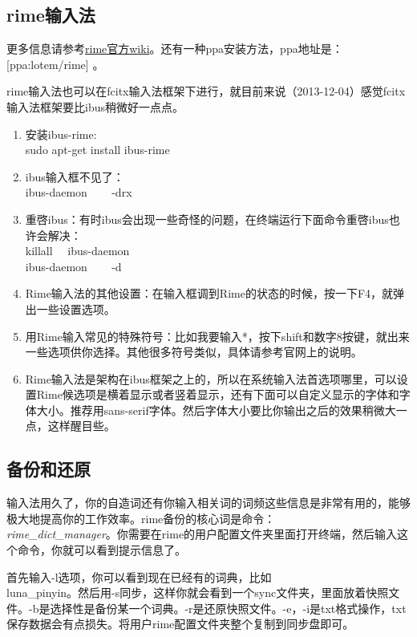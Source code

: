 \documentclass[12pt,oneside]{book}
\begin{document}
\begin{common-format}
\section{rime输入法}
更多信息请参考\href{https://code.google.com/p/rimeime/w/list}{rime官方wiki}。还有一种ppa安装方法，ppa地址是：[ppa:lotem/rime] 。

rime输入法也可以在fcitx输入法框架下进行，就目前来说（2013-12-04）感觉fcitx输入法框架要比ibus稍微好一点点。

\begin{enumerate}
\item 安装ibus-rime:\\ sudo apt-get install ibus-rime
\item ibus输入框不见了：\\ ibus-daemon  ~~~  -drx
\item 重啓ibus：有时ibus会出现一些奇怪的问题，在终端运行下面命令重啓ibus也许会解决：\\ killall ~~ibus-daemon\\
             ibus-daemon ~~~ -d
\item Rime输入法的其他设置：在输入框调到Rime的状态的时候，按一下F4，就弹出一些设置选项。
\item 用Rime输入常见的特殊符号：比如我要输入*，按下shift和数字8按键，就出来一些选项供你选择。其他很多符号类似，具体请参考官网上的说明。
\item Rime输入法是架构在ibus框架之上的，所以在系统输入法首选项哪里，可以设置Rime候选项是横着显示或者竖着显示，还有下面可以自定义显示的字体和字体大小。推荐用sans-serif字体。然后字体大小要比你输出之后的效果稍微大一点，这样醒目些。
\end{enumerate}

\subsection{备份和还原}
输入法用久了，你的自造词还有你输入相关词的词频这些信息是非常有用的，能够极大地提高你的工作效率。rime备份的核心词是命令：\\ \emph{rime\_{}dict\_{}manager}。你需要在rime的用户配置文件夹里面打开终端，然后输入这个命令，你就可以看到提示信息了。

首先输入-l选项，你可以看到现在已经有的词典，比如\\ luna\_{}pinyin。然后用-s同步，这样你就会看到一个sync文件夹，里面放着快照文件。-b是选择性是备份某一个词典。-r是还原快照文件。-e，-i是txt格式操作，txt保存数据会有点损失。将用户rime配置文件夹整个复制到同步盘即可。


\end{common-format}
\end{document}

